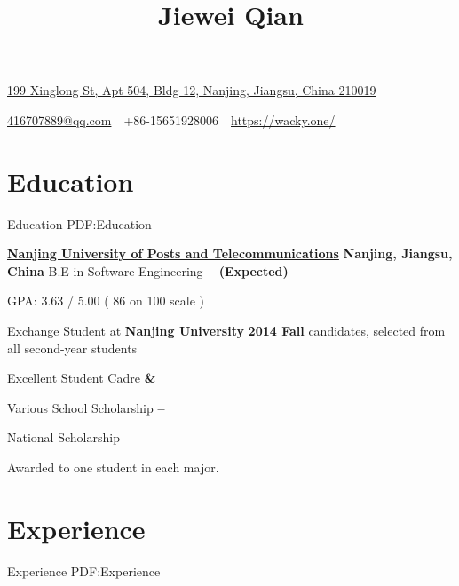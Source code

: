\documentclass[a4paper,MMMyyyy,nonstop]{simpleresumecv}
\newcommand{\CVAuthor}{Jiewei Qian}
\newcommand{\CVWebpage}{https://wacky.one/}
\begin{document}
\thispagestyle{empty}


\title{\CVAuthor}

\begin{subtitle}
\href{https://www.google.com/maps/place/199+Xing+Long+Da+Jie,+Jianye+Qu,+Nanjing+Shi,+Jiangsu+Sheng,+China,+210019/}
{199 Xinglong St, Apt 504, Bldg 12, Nanjing, Jiangsu, China 210019}
\par
\href{mailto:416707889@qq.com}
{416707889@qq.com}
\,\SubBulletSymbol\,
+86-15651928006
\,\SubBulletSymbol\,
\href{\CVWebpage}
{\CVWebpage}
\end{subtitle}

\begin{body}


\section
{Education}
{Education}
{PDF:Education}

\href{http://www.njupt.edu.cn/}
{\textbf{Nanjing University of Posts and Telecommunications}}
\hfill \textbf{ Nanjing, Jiangsu, China }
\BulletItem
B.E in Software Engineering
\hfill
\textbf{
     --
     (Expected)
}

\BulletItem
GPA: 3.63 / 5.00 ( 86 on 100 scale )

\BulletItem
Exchange Student at \href{http://www.nju.edu.cn/}{\textbf{Nanjing University}}
\hfill
\textbf{
    2014 Fall
}
 candidates, selected from all second-year students

\BulletItem
Excellent Student Cadre
\hfill
\textbf{
     \& 
}

\BulletItem
Various School Scholarship
\hfill
\textbf{
     --  
}

\BulletItem
National Scholarship
\hfill
\textbf{
}
\begin{detail}
\SubItem
Awarded to one student in each major.
\end{detail}


\section
{Experience}
{Experience}
{PDF:Experience}


\end{body}
\end{document}
